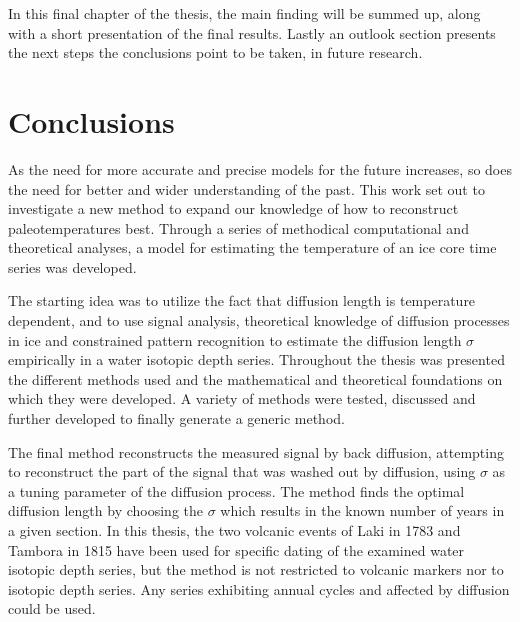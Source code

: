 \documentclass[../../CompleteThesis2/Complete_2ndDraft]{subfiles}
\begin{document}
In this final chapter of the thesis, the main finding will be summed up, along with a short presentation of the final results. Lastly an outlook section presents the next steps the conclusions point to be taken, in future research.
\minitoc	

\section[Conclusions]{Conclusions}
As the need for more accurate and precise models for the future increases, so does the need for better and wider understanding of the past. This work set out to investigate a new method to expand our knowledge of how to reconstruct paleotemperatures best. Through a series of methodical computational and theoretical analyses, a model for estimating the temperature of an ice core time series was developed. 

The starting idea was to utilize the fact that diffusion length is temperature dependent, and to use signal analysis, theoretical knowledge of diffusion processes in ice and constrained pattern recognition to estimate the diffusion length $\sigma$ empirically in a water isotopic depth series. Throughout the thesis was presented the different methods used and the mathematical and theoretical foundations on which they were developed. A variety of methods were tested, discussed and further developed to finally generate a generic method.

The final method reconstructs the measured signal by back diffusion, attempting to reconstruct the part of the signal that was washed out by diffusion, using $\sigma$ as a tuning parameter of the diffusion process. The method finds the optimal diffusion length by choosing the $\sigma$ which results in the known number of years in a given section. In this thesis, the two volcanic events of Laki in 1783 and Tambora in 1815 have been used for specific dating of the examined water isotopic depth series, but the method is not restricted to volcanic markers nor to isotopic depth series. Any series exhibiting annual cycles and affected by diffusion could be used.
\end{document}

